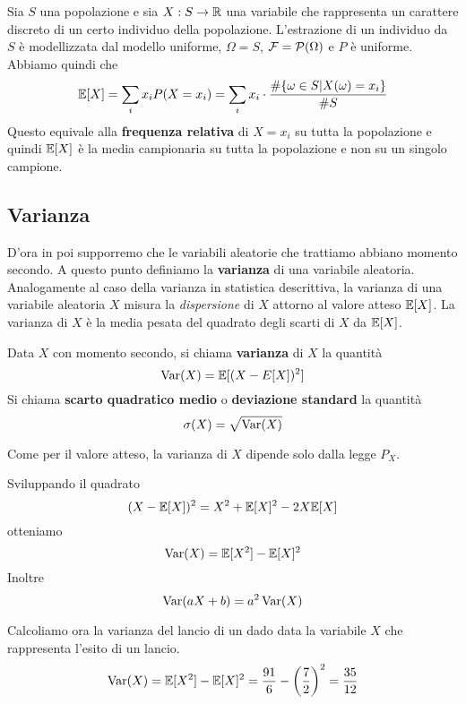 \begin{example}
	Sia $S$ una popolazione e sia $X : S \to \mathbb{R}$ una variabile che rappresenta un carattere
	discreto di un certo individuo della popolazione. L'estrazione di un individuo da $S$ è
	modellizzata dal modello uniforme, $\Omega = S$, $\mathcal{F} = \mathcal{P}(\Omega)$ e $P$ è uniforme.
	Abbiamo quindi che
	\[
		\mathbb{E}[X] = \sum_i x_i P(X = x_i) =
		\sum_i x_i \cdot \frac{\# \{\omega \in S | X(\omega) = x_i\}}{\# S}
	\]
	Questo equivale alla \textbf{frequenza relativa} di $X = x_i$ su tutta la popolazione e quindi
	$\mathbb{E}[X]$ è la media campionaria su tutta la popolazione e non su un singolo campione.
\end{example}

\subsection{Varianza}
D'ora in poi supporremo che le variabili aleatorie che trattiamo abbiano momento secondo. A questo
punto definiamo la \textbf{varianza} di una variabile aleatoria. Analogamente al caso della
varianza in statistica descrittiva, la varianza di una variabile aleatoria $X$ misura la
\emph{dispersione} di $X$ attorno al valore atteso $\mathbb{E}[X]$. La varianza di $X$ è la media pesata
del quadrato degli scarti di $X$ da $\mathbb{E}[X]$.

\begin{definition}
	Data $X$ con momento secondo, si chiama \textbf{varianza} di $X$ la quantità
	\[ \operatorname{Var}(X) = \mathbb{E}[(X - E[X])^2] \]
	Si chiama \textbf{scarto quadratico medio} o \textbf{deviazione standard} la quantità
	\[ \sigma(X) = \sqrt{\operatorname{Var}(X)} \]
\end{definition}

\begin{observation}
	Come per il valore atteso, la varianza di $X$ dipende solo dalla legge $P_X$.
\end{observation}

Sviluppando il quadrato
\[ (X - \mathbb{E}[X])^2 = X^2 + \mathbb{E}[X]^2 - 2 X \mathbb{E}[X] \]
otteniamo
\[ \operatorname{Var}(X) = \mathbb{E}[X^2] - \mathbb{E}[X]^2 \]
Inoltre
\[ \operatorname{Var}(aX + b) = a^2 \operatorname{Var}(X) \]

\begin{example}
	Calcoliamo ora la varianza del lancio di un dado data la variabile $X$ che rappresenta l'esito
	di un lancio.
	\[ \operatorname{Var}(X) = \mathbb{E}[X^2] - \mathbb{E}[X]^2 = \frac{91}{6} - \left(\frac{7}{2}\right)^2 = \frac{35}{12} \]
\end{example}

